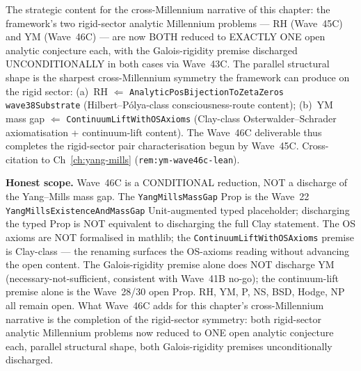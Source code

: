 \begin{remark}
\begin{itemize}
\end{itemize}
The strategic content for the cross-Millennium narrative of this chapter: the framework's two rigid-sector analytic Millennium problems --- RH (Wave~45C) and YM (Wave~46C) --- are now BOTH reduced to EXACTLY ONE open analytic conjecture each, with the Galois-rigidity premise discharged UNCONDITIONALLY in both cases via Wave~43C. The parallel structural shape is the sharpest cross-Millennium symmetry the framework can produce on the rigid sector: (a)~RH $\Leftarrow$ \texttt{AnalyticPosBijectionToZetaZeros wave38Substrate} (Hilbert--P\'olya-class consciousness-route content); (b)~YM mass gap $\Leftarrow$ \texttt{ContinuumLiftWithOSAxioms} (Clay-class Osterwalder--Schrader axiomatisation + continuum-lift content). The Wave~46C deliverable thus completes the rigid-sector pair characterisation begun by Wave~45C. Cross-citation to Ch~\ref{ch:yang-mills} (\texttt{rem:ym-wave46c-lean}).

\textbf{Honest scope.} Wave~46C is a CONDITIONAL reduction, NOT a discharge of the Yang--Mills mass gap. The \texttt{YangMillsMassGap} Prop is the Wave~22 \texttt{YangMillsExistenceAndMassGap} Unit-augmented typed placeholder; discharging the typed Prop is NOT equivalent to discharging the full Clay statement. The OS axioms are NOT formalised in mathlib; the \texttt{ContinuumLiftWithOSAxioms} premise is Clay-class --- the renaming surfaces the OS-axioms reading without advancing the open content. The Galois-rigidity premise alone does NOT discharge YM (necessary-not-sufficient, consistent with Wave~41B no-go); the continuum-lift premise alone is the Wave~28/30 open Prop. RH, YM, P, NS, BSD, Hodge, NP all remain open. What Wave~46C adds for this chapter's cross-Millennium narrative is the completion of the rigid-sector symmetry: both rigid-sector analytic Millennium problems now reduced to ONE open analytic conjecture each, parallel structural shape, both Galois-rigidity premises unconditionally discharged.
\end{remark}

